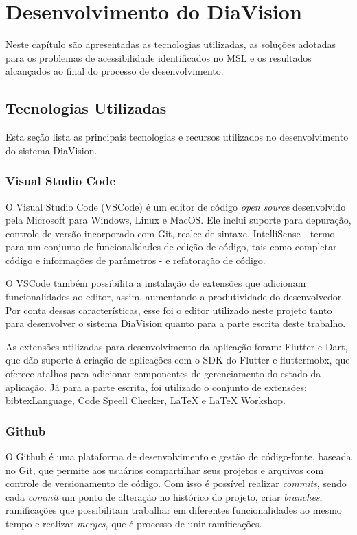 \chapter{Desenvolvimento do DiaVision}
\label{ch:development}

Neste capítulo são apresentadas as tecnologias utilizadas, as soluções adotadas para os problemas
de acessibilidade identificados no MSL e os resultados alcançados ao final do processo de desenvolvimento.

\section{Tecnologias Utilizadas}

Esta seção lista as principais tecnologias e recursos utilizados no desenvolvimento do sistema DiaVision.

\subsection{Visual Studio Code}

O Visual Studio Code (VSCode) é um editor de código \emph{open source} desenvolvido pela Microsoft para Windows, Linux e MacOS.
Ele inclui suporte para depuração, controle de versão incorporado com Git, realce de sintaxe, IntelliSense
- termo para um conjunto de funcionalidades de edição de código, tais como completar código e informações de parâmetros -
e refatoração de código.

O VSCode também possibilita a instalação de extensões que adicionam funcionalidades ao editor, assim, aumentando a produtividade do desenvolvedor.
Por conta dessas características, esse foi o editor utilizado neste projeto tanto para desenvolver o sistema DiaVision quanto para a parte escrita deste trabalho.

As extensões utilizadas para desenvolvimento da aplicação foram: Flutter e Dart, que dão suporte à criação de aplicações com o SDK do Flutter
e fluttermobx, que oferece atalhos para adicionar componentes de gerenciamento do estado da aplicação. Já para a parte escrita,
foi utilizado o conjunto de extensões: bibtexLanguage, Code Speell Checker, LaTeX e LaTeX Workshop.

\newpage

\subsection{Github}

O Github é uma plataforma de desenvolvimento e gestão de código-fonte, baseada no Git, que permite aos usuários compartilhar seus projetos e arquivos com controle
de versionamento de código. Com isso é possível realizar \emph{commits}, sendo cada \emph{commit} um ponto de alteração no histórico do
projeto, criar \emph{branches}, ramificações que possibilitam trabalhar em diferentes funcionalidades ao mesmo tempo e realizar \emph{merges},
que é processo de unir ramificações.

